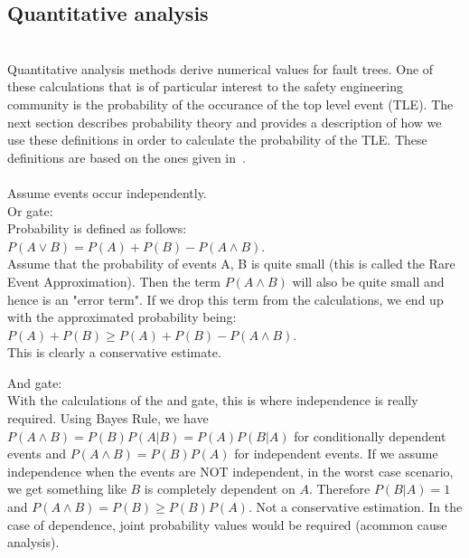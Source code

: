 \subsection{Quantitative analysis}
\\

Quantitative analysis methods derive numerical values for fault trees. One of these calculations that is of particular interest to the safety engineering community is the probability of the occurance of the top level event (TLE). The next section describes probability theory and provides a description of how we use these definitions in order to calculate the probability of the TLE. These definitions are based on the ones given in~\cite{RuijtersSurvey}.\\

\\
Assume events occur independently. \\

Or gate: \\
Probability is defined as follows: \\
$P(A \lor B) = P(A) + P(B) - P(A \land B)$. \\
Assume that the probability of events A, B is quite small (this is called the Rare Event Approximation). Then the term $P(A \land B)$ will also be quite small and hence is an "error term". If we drop this term from the calculations, we end up with the approximated probability being: $P(A) + P(B) \geq P(A) + P(B) - P(A \land B)$. \\ This is clearly a conservative estimate. 

And gate: \\
With the calculations of the and gate, this is where independence is really required. Using Bayes Rule, we have $P(A \land B) = P(B)P(A|B) = P(A)P(B|A)$ for conditionally dependent events and $P(A \land B) = P(B)P(A)$ for independent events. If we assume independence when the events are NOT independent, in the worst case scenario, we get something like $B$ is completely dependent on $A$. Therefore $P(B|A) = 1$ and $P(A \land B) = P(B) \geq P(B)P(A)$. Not a conservative estimation. In the case of dependence, joint probability values would be required (acommon cause analysis).  \\

